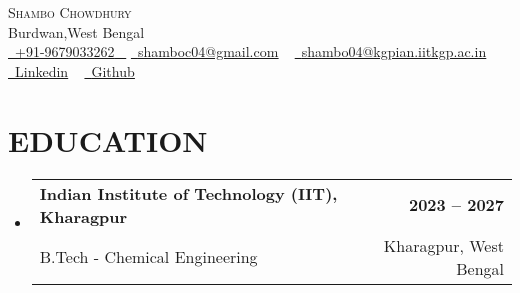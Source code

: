 \documentclass[letterpaper,11pt]{article}
\makeatletter
\newcommand{\resumeSubheading}[4]{
  \vspace{-2pt}\item
    \begin{tabular*}{1.0\textwidth}[t]{l@{\extracolsep{\fill}}r}
      \textbf{\large#1} & \textbf{\small #2} \\
      {\large#3} & {\small #4} \\
      
    \end{tabular*}\vspace{-7pt}
}
\newcommand{\resumeSubHeadingListStart}{\begin{itemize}[leftmargin=0.0in, label={}]}
\newcommand{\resumeSubHeadingListEnd}{\end{itemize}}
\makeatother
\begin{document}
\begin{center}
    {\Huge \scshape Shambo Chowdhury} \\ \vspace{1pt}
    Burdwan,West Bengal \\ \vspace{1pt}
    \small \href{tel:#}{ \raisebox{-0.1\height}\faPhone\ \underline{+91-9679033262} ~} 
    \href{mailto:shamboc04@gmail.com}{\raisebox{-0.2\height}\faEnvelope\  \underline{shamboc04@gmail.com}} ~ 
    \href{mailto:shambo04@kgpian.iitkgp.ac.in}{\raisebox{-0.2\height}\faEnvelope\  \underline{shambo04@kgpian.iitkgp.ac.in}} ~ 
    \href{https://linkedin.com/in/shambo04}{\raisebox{-0.2\height}\faLinkedinSquare\ \underline{Linkedin}}  ~
    \href{https://github.com/typhonshambo}{\raisebox{-0.2\height}\faGithub\ \underline{Github}} ~

\end{center}
 \vspace{0.5mm}


\section{EDUCATION}
  \resumeSubHeadingListStart
    \resumeSubheading
      {Indian Institute of Technology (IIT), Kharagpur}{2023 – 2027}
      {B.Tech - Chemical Engineering}{Kharagpur, West Bengal}
  \resumeSubHeadingListEnd
  

\end{document}
